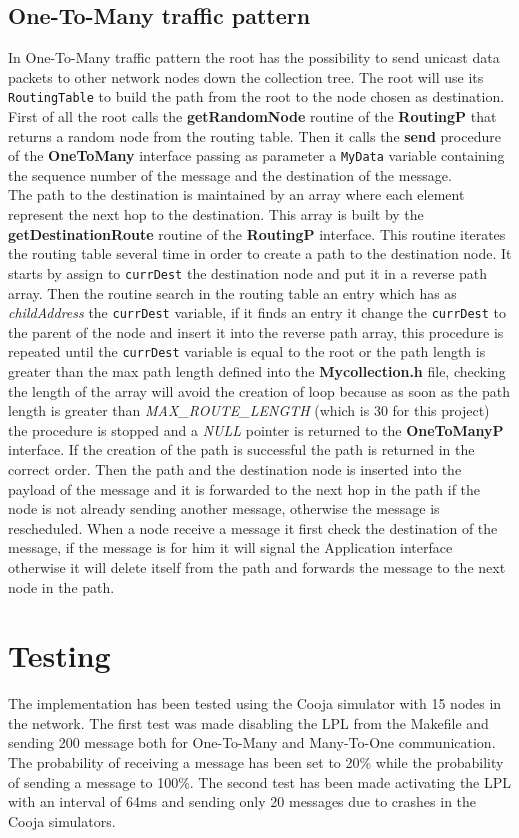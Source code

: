 \documentclass{article}
\begin{document}
    \subsection{One-To-Many traffic pattern}
In One-To-Many traffic pattern the root has the possibility to send unicast data packets to other network nodes down the collection tree. The root will use its \texttt{RoutingTable} to build the path from the root to the node chosen as destination. \\
First of all the root calls the \textbf{getRandomNode} routine of the \textbf{RoutingP} that returns a random node from the routing table. Then it calls the \textbf{send} procedure of the \textbf{OneToMany} interface passing as parameter a \texttt{MyData} variable containing the sequence number of the message and the destination of the message.\\
The path to the destination is maintained by an array where each element represent the next hop to the destination. This array is built by the \textbf{getDestinationRoute} routine of the \textbf{RoutingP} interface. This routine iterates the routing table several time in order to create a path to the destination node. It starts by assign to \texttt{currDest} the destination node and put it in a reverse path array. Then the routine search in the routing table an entry which has as \emph{childAddress} the \texttt{currDest} variable, if it finds an entry it change the \texttt{currDest} to the parent of the node and insert it into the reverse path array, this procedure is repeated until the \texttt{currDest} variable is equal to the root or the path length is greater than the max path length defined into the \textbf{Mycollection.h} file, checking the length of the array will avoid the creation of loop because as soon as the path length is  greater than \emph{MAX\_ROUTE\_LENGTH} (which is 30 for this project) the procedure is stopped and a \emph{NULL} pointer is returned to the \textbf{OneToManyP} interface. If the creation of the path is successful the path is returned in the correct order. Then the path and the destination node is inserted into the payload of the message and it is forwarded to the next hop in the path if the node is not already sending another message, otherwise the message is rescheduled. When a node receive a message it first check the destination of the message, if the message is for him it will signal the Application interface otherwise it will delete itself from the path and forwards the message to the next node in the path.
\section{Testing}
The implementation has been tested using the Cooja simulator with 15 nodes in the network. The first test was made disabling the LPL from the Makefile and sending 200 message both for One-To-Many and Many-To-One communication. The probability of receiving a message has been set to 20\% while the probability of sending a message to 100\%. The second test has been made activating the LPL with an interval of 64ms and sending only 20 messages due to crashes in the Cooja simulators.\\
\end{document}
